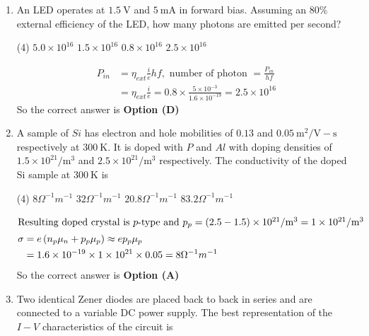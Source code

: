 \begin{enumerate}
	\item An LED operates at $1.5 \mathrm{~V}$ and $5 \mathrm{~mA}$ in forward bias. Assuming an $80 \%$ external efficiency of the LED, how many photons are emitted per second?
{	}
\begin{tasks}(4)
\task[\textbf{A.}] $5.0 \times 10^{16}$
\task[\textbf{B.}]  $1.5 \times 10^{16}$
\task[\textbf{C.}] $0.8 \times 10^{16}$
\task[\textbf{D.}] $2.5 \times 10^{16}$
\end{tasks}
\begin{answer}
\begin{align*}
P_{i n}&=\eta_{e x t} \frac{i}{e} h f,\text{ number of photon }=\frac{P_{i n}}{h f}\\&=\eta_{e x t} \frac{i}{e}=0.8 \times \frac{5 \times 10^{-3}}{1.6 \times 10^{-19}}=2.5 \times 10^{16}
\end{align*}
So the correct answer is \textbf{Option (D)}
\end{answer}
	\item A sample of $S i$ has electron and hole mobilities of $0.13$ and $0.05 \mathrm{~m}^{2} / \mathrm{V}-\mathrm{s}$ respectively at $300 \mathrm{~K}$. It is doped with $P$ and $A l$ with doping densities of $1.5 \times 10^{21} / \mathrm{m}^{3}$ and $2.5 \times 10^{21} / \mathrm{m}^{3}$ respectively. The conductivity of the doped Si sample at $300 \mathrm{~K}$ is
{	}
\begin{tasks}(4)
\task[\textbf{A.}] $8 \Omega^{-1} m^{-1}$
\task[\textbf{B.}] $32 \Omega^{-1} m^{-1}$
\task[\textbf{C.}] $20.8 \Omega^{-1} m^{-1}$
\task[\textbf{D.}] $83.2 \Omega^{-1} m^{-1}$
\end{tasks}
\begin{answer}
\begin{align*}
\intertext{Resulting doped crystal is $p$-type and $p_{p}=(2.5-1.5) \times 10^{21} / \mathrm{m}^{3}=1 \times 10^{21} / \mathrm{m}^{3}$}
\sigma&=e\left(n_{p} \mu_{n}+p_{p} \mu_{p}\right) \approx e p_{p} \mu_{p}\\&=1.6 \times 10^{-19} \times 1 \times 10^{21} \times 0.05=8 \Omega^{-1} m^{-1}
\end{align*}
So the correct answer is \textbf{Option (A)}
\end{answer}
	\item Two identical Zener diodes are placed back to back in series and are connected to a variable DC power supply. The best representation of the $I-V$ characteristics of the circuit is

\end{enumerate}

